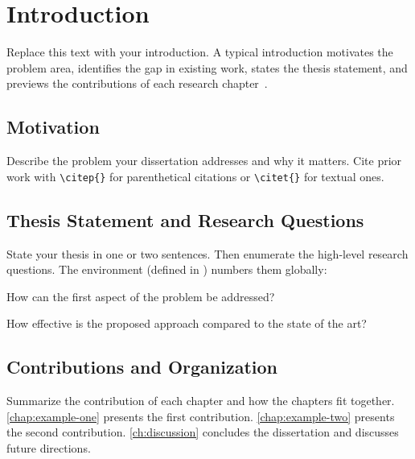 
\chapter{Introduction}
\label{ch:introduction}

Replace this text with your introduction.  A typical introduction
motivates the problem area, identifies the gap in existing work,
states the thesis statement, and previews the contributions of each
research chapter~.

\section{Motivation}

Describe the problem your dissertation addresses and why it matters.
Cite prior work with \verb|\citep{}| for parenthetical citations
\citep{lamport1994latex} or \verb|\citet{}| for textual ones.

\section{Thesis Statement and Research Questions}

State your thesis in one or two sentences.  Then enumerate the
high-level research questions.  The 
environment (defined in ) numbers them globally:

\begin{researchquestions}
\item How can the first aspect of the problem be addressed?
\item How effective is the proposed approach compared to the state of
the art?
\end{researchquestions}

\section{Contributions and Organization}

Summarize the contribution of each chapter and how the chapters fit
together.  \autoref{chap:example-one} presents the first
contribution.  \autoref{chap:example-two} presents the second
contribution.  \autoref{ch:discussion} concludes the dissertation and
discusses future directions.
